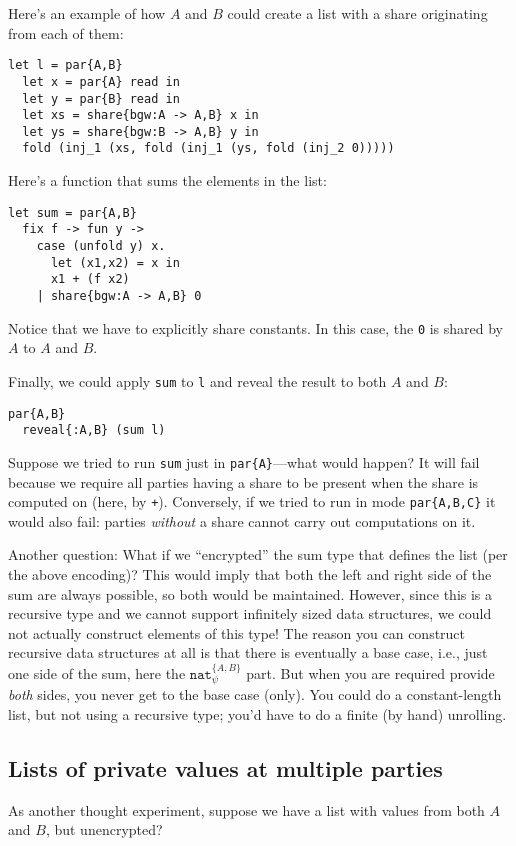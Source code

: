 \documentclass[10pt]{article}
\newcommand{\tnat}{\ensuremath{\mathtt{nat}}}
\begin{document}
Here's an example of how $A$ and $B$ could create a list with a share
originating from each of them:
\begin{verbatim}
let l = par{A,B}
  let x = par{A} read in
  let y = par{B} read in
  let xs = share{bgw:A -> A,B} x in
  let ys = share{bgw:B -> A,B} y in
  fold (inj_1 (xs, fold (inj_1 (ys, fold (inj_2 0)))))
\end{verbatim}
Here's a function that sums the elements in the list:
\begin{verbatim}
let sum = par{A,B}
  fix f -> fun y ->
    case (unfold y) x.
      let (x1,x2) = x in
      x1 + (f x2)
    | share{bgw:A -> A,B} 0
\end{verbatim}
Notice that we have to explicitly share constants. In this case, the
\verb+0+ is shared by $A$ to $A$ and $B$.

Finally, we could apply \verb+sum+ to \verb+l+ and reveal the result
to both $A$ and $B$:
\begin{verbatim}
par{A,B}
  reveal{:A,B} (sum l)
\end{verbatim}

Suppose we tried to run \verb+sum+ just in \verb+par{A}+---what would
happen? It will fail because we require all parties having a share to
be present when the share is computed on (here, by
\verb!+!). Conversely, if we tried to run in mode \verb+par{A,B,C}+ it
would also fail: parties \emph{without} a share cannot carry out
computations on it.

Another question: What if we ``encrypted'' the sum type that defines
the list (per the above encoding)? This would imply that both the left
and right side of the sum are always possible, so both would be
maintained. However, since this is a recursive type and we cannot
support infinitely sized data structures, we could not actually
construct elements of this type! The reason you can construct
recursive data structures at all is that there is eventually a base
case, i.e., just one side of the sum, here the $\tnat^{\{A,B\}}_\psi$
part. But when you are required provide \emph{both} sides, you never
get to the base case (only). You could do a constant-length list, but
not using a recursive type; you'd have to do a finite (by hand)
unrolling.

\subsection{Lists of private values at multiple parties}

As another thought experiment, suppose we have a list with values from
both $A$ and $B$, but unencrypted?
\end{document}
